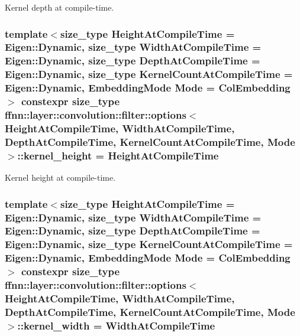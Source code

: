 Kernel depth at compile-\/time. 

\hypertarget{structffnn_1_1layer_1_1convolution_1_1filter_1_1options_a89572b22e67e07c6f68d5c51070b0dbf}{
\subsubsection[{kernel\-\_\-height}]{\setlength{\rightskip}{0pt plus 5cm}template$<$size\-\_\-type Height\-At\-Compile\-Time = Eigen\-::\-Dynamic, size\-\_\-type Width\-At\-Compile\-Time = Eigen\-::\-Dynamic, size\-\_\-type Depth\-At\-Compile\-Time = Eigen\-::\-Dynamic, size\-\_\-type Kernel\-Count\-At\-Compile\-Time = Eigen\-::\-Dynamic, Embedding\-Mode Mode = Col\-Embedding$>$ constexpr {\bf size\-\_\-type} {\bf ffnn\-::layer\-::convolution\-::filter\-::options}$<$ Height\-At\-Compile\-Time, Width\-At\-Compile\-Time, Depth\-At\-Compile\-Time, Kernel\-Count\-At\-Compile\-Time, Mode $>$\-::kernel\-\_\-height = Height\-At\-Compile\-Time\hspace{0.3cm}{\ttfamily [static]}}}\label{structffnn_1_1layer_1_1convolution_1_1filter_1_1options_a89572b22e67e07c6f68d5c51070b0dbf}


Kernel height at compile-\/time. 

\hypertarget{structffnn_1_1layer_1_1convolution_1_1filter_1_1options_afd97cb92020381b3f2489b92946fdc11}{
\subsubsection[{kernel\-\_\-width}]{\setlength{\rightskip}{0pt plus 5cm}template$<$size\-\_\-type Height\-At\-Compile\-Time = Eigen\-::\-Dynamic, size\-\_\-type Width\-At\-Compile\-Time = Eigen\-::\-Dynamic, size\-\_\-type Depth\-At\-Compile\-Time = Eigen\-::\-Dynamic, size\-\_\-type Kernel\-Count\-At\-Compile\-Time = Eigen\-::\-Dynamic, Embedding\-Mode Mode = Col\-Embedding$>$ constexpr {\bf size\-\_\-type} {\bf ffnn\-::layer\-::convolution\-::filter\-::options}$<$ Height\-At\-Compile\-Time, Width\-At\-Compile\-Time, Depth\-At\-Compile\-Time, Kernel\-Count\-At\-Compile\-Time, Mode $>$\-::kernel\-\_\-width = Width\-At\-Compile\-Time\hspace{0.3cm}{\ttfamily [static]}}}\label{structffnn_1_1layer_1_1convolution_1_1filter_1_1options_afd97cb92020381b3f2489b92946fdc11}


